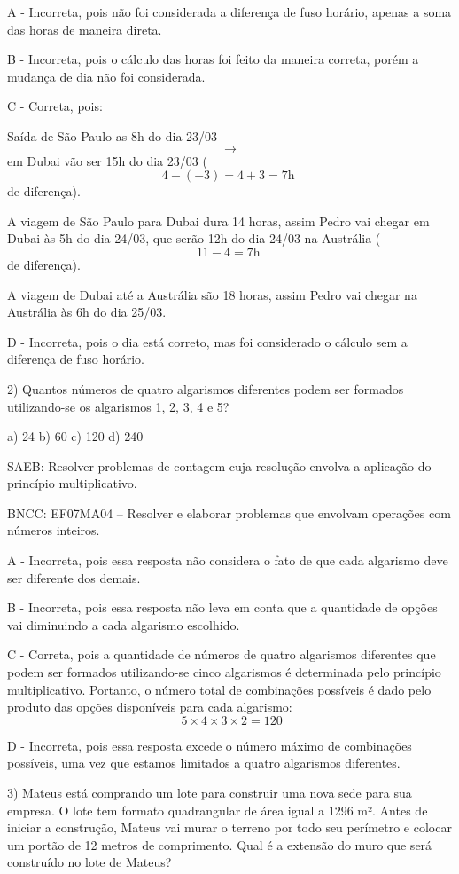 A - Incorreta, pois não foi considerada a diferença de fuso horário,
apenas a soma das horas de maneira direta.

B - Incorreta, pois o cálculo das horas foi feito da maneira correta,
porém a mudança de dia não foi considerada.

C - Correta, pois:

Saída de São Paulo as 8h do dia 23/03 \[\rightarrow\] em Dubai vão ser
15h do dia 23/03 (\[4 - ( - 3) = 4 + 3 = 7\text{h\ }\]de diferença).

A viagem de São Paulo para Dubai dura 14 horas, assim Pedro vai chegar
em Dubai às 5h do dia 24/03, que serão 12h do dia 24/03 na Austrália
(\[11 - 4 = 7\text{h\ }\]de diferença).

A viagem de Dubai até a Austrália são 18 horas, assim Pedro vai chegar
na Austrália às 6h do dia 25/03.

D - Incorreta, pois o dia está correto, mas foi considerado o cálculo
sem a diferença de fuso horário.

2) Quantos números de quatro algarismos diferentes podem ser formados
utilizando-se os algarismos 1, 2, 3, 4 e 5?

a) 24 b) 60 c) 120 d) 240

SAEB: Resolver problemas de contagem cuja resolução envolva a aplicação
do princípio multiplicativo.

BNCC: EF07MA04 -- Resolver e elaborar problemas que envolvam operações
com números inteiros.

A - Incorreta, pois essa resposta não considera o fato de que cada
algarismo deve ser diferente dos demais.

B - Incorreta, pois essa resposta não leva em conta que a quantidade de
opções vai diminuindo a cada algarismo escolhido.

C - Correta, pois a quantidade de números de quatro algarismos
diferentes que podem ser formados utilizando-se cinco algarismos é
determinada pelo princípio multiplicativo. Portanto, o número total de
combinações possíveis é dado pelo produto das opções disponíveis para
cada algarismo: \[\ 5 \times 4\times 3\times 2  = 120\]

D - Incorreta, pois essa resposta excede o número máximo de combinações
possíveis, uma vez que estamos limitados a quatro algarismos diferentes.

3) Mateus está comprando um lote para construir uma nova sede para sua
empresa. O lote tem formato quadrangular de área igual a 1296 m². Antes
de iniciar a construção, Mateus vai murar o terreno por todo seu
perímetro e colocar um portão de 12 metros de comprimento. Qual é a
extensão do muro que será construído no lote de Mateus?

